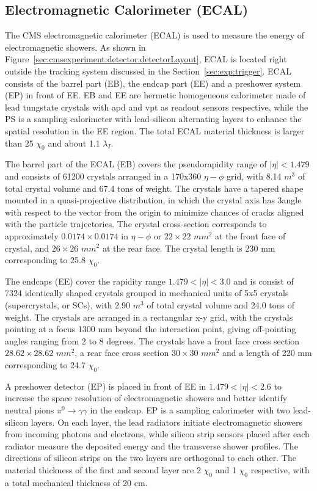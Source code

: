 \subsection{Electromagnetic Calorimeter (ECAL)}
The CMS electromagnetic calorimeter (ECAL) \cite{cms:ecalTdr:CMS:1997ysd} is used to measure the energy of electromagnetic showers. As shown in Figure~\ref{sec:cmsexperiment:detector:detectorLayout}, ECAL is located right outside the tracking system discussed in the Section~\ref{sec:exp:trigger}. ECAL consists of the barrel part (EB), the endcap part (EE) and a preshower system (EP) in front of EE. EB and EE are hermetic homogeneous calorimeter made of lead tungstate crystals with \acrfull{apd} and \acrfull{vpt} as readout sensors respective, while the PS is a sampling calorimeter with lead-silicon alternating layers to enhance the spatial resolution in the EE region. The total ECAL material thickness is larger than 25 $\chi_0$ and about 1.1 $\lambda_I$.

The barrel part of the ECAL (EB) covers the pseudorapidity range of $|\eta|< 1.479$ and consists of 61200 crystals arranged in a 170x360 $\eta - \phi$ grid, with 8.14 $m^3$ of total crystal volume and 67.4 tons of weight. The crystals have a tapered shape mounted in a quasi-projective distribution, in which the crystal axis has 3\degree angle with respect to the vector from the origin to minimize chances of cracks aligned with the particle trajectories. The crystal cross-section corresponds to approximately $0.0174 \times 0.0174$ in $\eta - \phi$ or $22 \times 22$ $mm^2$ at the front face of crystal, and $26\times26$ $mm^2$ at the rear face. The crystal length is 230 mm corresponding to 25.8 $\chi_0$.

The endcaps (EE) cover the rapidity range $1.479 < |\eta| < 3.0$ and is consist of 7324 identically shaped crystals grouped in mechanical units of 5x5 crystals (supercrystals, or SCs), with 2.90 $m^3$ of total crystal volume and 24.0 tons of weight. The crystals are arranged in a rectangular x-y grid, with the crystals pointing at a focus 1300 mm beyond the interaction point, giving off-pointing angles ranging from 2 to 8 degrees. The crystals have a front face cross section $28.62\times28.62$ $mm^2$, a rear face cross section $30\times30$ $mm^2$ and a length of 220 mm corresponding to 24.7 $\chi_0$.

A preshower detector (EP) is placed in front of EE in $1.479 < |\eta| < 2.6$ to increase the space resolution of electromagnetic showers and better identify neutral pions $\pi^0 \to \gamma \gamma$ in the endcap. EP is a sampling calorimeter with two lead-silicon layers. On each layer, the lead radiators initiate electromagnetic showers from incoming photons and electrons, while silicon strip sensors placed after each radiator measure the deposited energy and the transverse shower profiles. The directions of silicon strips on the two layers are orthogonal to each other. The material thickness of the first and second layer are 2 $\chi_0$ and 1 $\chi_0$ respective, with a total mechanical thickness of 20 cm.



